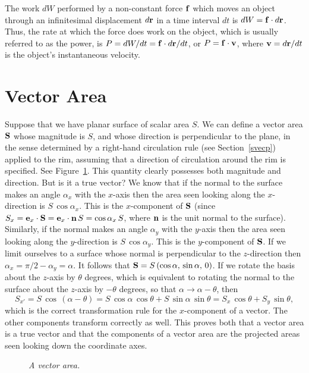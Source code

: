 The work $dW$ performed by a non-constant force ${\bf f}$ which moves an
object through an infinitesimal displacement $d{\bf r}$ in a time interval $dt$ is $dW={\bf f}\cdot d{\bf r}$. Thus, the rate at which the force does
work on the object, which is usually referred to as the power, is
$P = dW/dt = {\bf f}\cdot d{\bf r}/dt$, or $P={\bf f}\cdot {\bf v}$,
where ${\bf v} = d{\bf r}/dt$ is the object's instantaneous velocity.

\section{Vector Area}\label{sect22}
Suppose that we have planar surface of scalar area $S$. We can define a vector
area ${\bf S}$ whose magnitude is $S$, and whose direction is perpendicular to
the plane, in the sense determined  by  a right-hand circulation rule (see Section~\ref{svecp}) applied to  the rim, assuming that a direction of circulation around the rim is specified. See Figure~\ref{f4}.
This quantity clearly possesses both magnitude and direction. But is it a true
vector? We know that if the normal to the surface makes an angle $\alpha_x$ with
the $x$-axis then the area seen looking along the $x$-direction is $S\,\cos\alpha_x$.
This is the $x$-component of ${\bf S}$ (since $S_x={\bf e}_x\cdot {\bf S}={\bf e}_x\cdot{\bf n}\,S=\cos\alpha_x\,S$,
where ${\bf n}$ is the unit normal to the surface).
Similarly, if the normal makes an angle $\alpha_y$ with the $y$-axis then the
area seen looking along the $y$-direction is $S\,\cos\alpha_y$. 
This is the $y$-component of ${\bf S}$. If we limit ourselves to a surface whose
normal is perpendicular to the $z$-direction then $\alpha_x = \pi/2-\alpha_y=\alpha$.
It follows that ${\bf S} = S\,(\cos\alpha,\, \sin\alpha,\, 0)$. If we rotate the
basis about the
$z$-axis by $\theta$ degrees, which is equivalent to rotating the normal to
the surface about the $z$-axis by $-\theta$ degrees, so that $\alpha\rightarrow\alpha-\theta$, then
\begin{equation}\label{e29}
S_{x'} = S\,\cos\,(\alpha-\theta) = S\,\cos\alpha\,\cos\theta + S\,\sin\alpha\,\sin\theta
= S_x\,\cos\theta + S_y\,\sin\theta,
\end{equation}
which is the correct transformation rule for the $x$-component of a vector. The
other components transform correctly as well. This  proves both
that a vector area is a
true vector and that the components of a vector area are the projected areas seen looking
down the coordinate axes. 
\begin{figure}
\epsfysize=1.5in
\centerline{}
\caption{\em A vector area.}\label{f4}
\end{figure}

